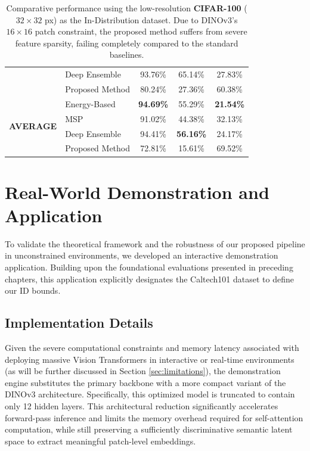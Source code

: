 \documentclass[oneside]{ctuthesis}
\begin{document}
\begin{table}[htbp]
\begin{tabular}{@{}llccc@{}}
        & Deep Ensemble      & 93.76\% & 65.14\% & 27.83\% \\
        & Proposed Method    & 80.24\% & 27.36\% & 60.38\% \\
        \midrule
        \midrule
        \multirow{4}{*}{\textbf{AVERAGE}} 
        & Energy-Based       & \textbf{94.69\%} & 55.29\% & \textbf{21.54\%} \\
        & MSP                & 91.02\% & 44.38\% & 32.13\% \\
        & Deep Ensemble      & 94.41\% & \textbf{56.16\%} & 24.17\% \\
        & Proposed Method    & 72.81\% & 15.61\% & 69.52\% \\
        \bottomrule
    \end{tabular}
    \caption{Comparative performance using the low-resolution \textbf{CIFAR-100} ($32 \times 32$ px) as the In-Distribution dataset. Due to DINOv3's $16 \times 16$ patch constraint, the proposed method suffers from severe feature sparsity, failing completely compared to the standard baselines.}
    \label{tab:ood_cifar_failure}
\end{table}

\chapter{Real-World Demonstration and Application}
\label{chap:demo_application}

To validate the theoretical framework and the robustness of our proposed pipeline in unconstrained environments, we developed an interactive demonstration application. Building upon the foundational evaluations presented in preceding chapters, this application explicitly designates the Caltech101 dataset to define our ID bounds.

\section{Implementation Details}
\label{sec:demo_implementation}

Given the severe computational constraints and memory latency associated with deploying massive Vision Transformers in interactive or real-time environments (as will be further discussed in Section \ref{sec:limitations}), the demonstration engine substitutes the primary backbone with a more compact variant of the DINOv3 architecture. Specifically, this optimized model is truncated to contain only 12 hidden layers. This architectural reduction significantly accelerates forward-pass inference and limits the memory overhead required for self-attention computation, while still preserving a sufficiently discriminative semantic latent space to extract meaningful patch-level embeddings. 
\end{document}
